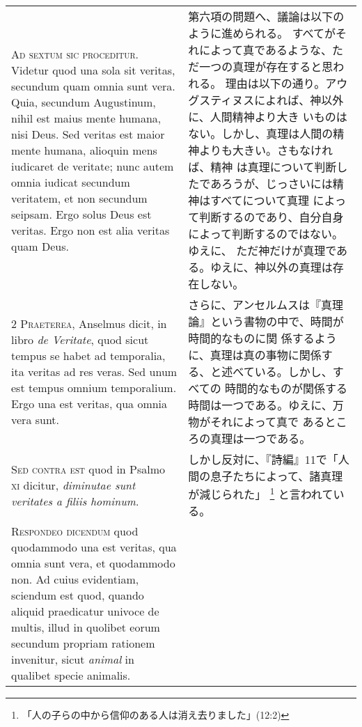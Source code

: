 \documentclass[10pt]{jsarticle} %
\begin{document}
\begin{longtable}{p{21em}p{21em}}

{\huge A}{\scshape d sextum sic proceditur}. Videtur
quod una sola sit veritas, secundum quam omnia sunt vera. Quia, secundum
Augustinum, nihil est maius mente humana, nisi Deus. Sed veritas est
maior mente humana, alioquin mens iudicaret de veritate; nunc autem
omnia iudicat secundum veritatem, et non secundum seipsam. Ergo solus
Deus est veritas. Ergo non est alia veritas quam Deus.


&

第六項の問題へ、議論は以下のように進められる。
すべてがそれによって真であるような、ただ一つの真理が存在すると思われる。
 理由は以下の通り。アウグスティヌスによれば、神以外に、人間精神より大き
 いものはない。しかし、真理は人間の精神よりも大きい。さもなければ、精神
 は真理について判断したであろうが、じっさいには精神はすべてについて真理
 によって判断するのであり、自分自身によって判断するのではない。ゆえに、
 ただ神だけが真理である。ゆえに、神以外の真理は存在しない。

\\


2 {\scshape Praeterea}, Anselmus dicit, in
libro {\itshape de Veritate}, quod sicut tempus se habet ad temporalia, ita veritas
ad res veras. Sed unum est tempus omnium temporalium. Ergo una est
veritas, qua omnia vera sunt.


&

さらに、アンセルムスは『真理論』という書物の中で、時間が時間的なものに関
 係するように、真理は真の事物に関係する、と述べている。しかし、すべての
 時間的なものが関係する時間は一つである。ゆえに、万物がそれによって真で
 あるところの真理は一つである。

\\


{\scshape Sed contra est} quod in Psalmo {\scshape xi}
dicitur, {\itshape diminutae sunt veritates a filiis hominum}.


&

しかし反対に、『詩編』11で「人間の息子たちによって、諸真理が減じられた」
 \footnote{「人の子らの中から信仰のある人は消え去りました」(12:2)}
 と言われている。

\\


{\scshape Respondeo dicendum} quod quodammodo
una est veritas, qua omnia sunt vera, et quodammodo non. Ad cuius
evidentiam, sciendum est quod, quando aliquid praedicatur univoce de
multis, illud in quolibet eorum secundum propriam rationem invenitur,
sicut {\itshape animal} in qualibet specie animalis.


\end{longtable}
\end{document}

